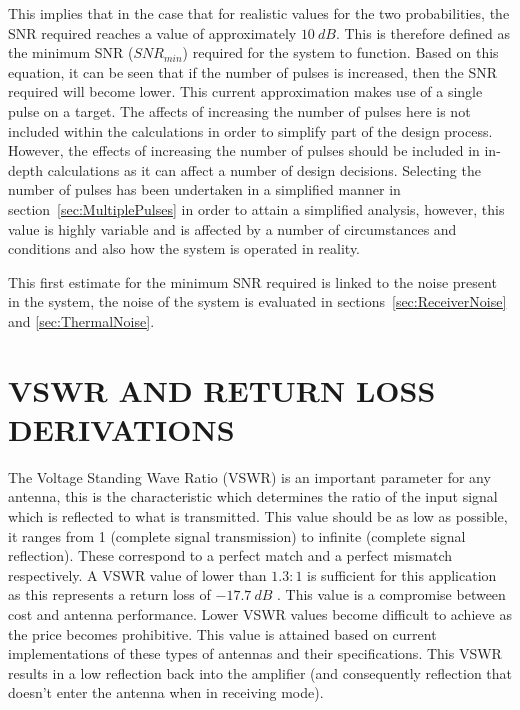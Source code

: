\documentclass[11pt]{witseiepaper}
\begin{document}
\begin{bibunit}[witseie]
This implies that in the case that for realistic values for the two probabilities, the SNR required reaches a value of approximately $10~dB$.
This is therefore defined as the minimum SNR ($SNR_{min}$) required for the system to function.
Based on this equation, it can be seen that if the number of pulses is increased, then the SNR required will become lower. This current approximation makes use of a single pulse on a target. The affects of increasing the number of pulses here is not included within the calculations in order to simplify part of the design process. However, the effects of increasing the number of pulses should be included in in-depth calculations as it can affect a number of design decisions. Selecting the number of pulses has been undertaken in a simplified manner in section~\ref{sec:MultiplePulses} in order to attain a simplified analysis, however, this value is highly variable and is affected by a number of circumstances and conditions and also how the system is operated in reality.


This first estimate for the minimum SNR required is linked to the noise present in the system, the noise of the system is evaluated in sections~\ref{sec:ReceiverNoise} and \ref{sec:ThermalNoise}.


\section{VSWR AND RETURN LOSS DERIVATIONS} \label{sec:VSWRandReturnLossDerivations}
The Voltage Standing Wave Ratio (VSWR) is an important parameter for any antenna, this is the characteristic which determines the ratio of the input signal which is reflected to what is transmitted. This value should be as low as possible, it ranges from 1 (complete signal transmission) to infinite (complete signal reflection). These correspond to a perfect match and a perfect mismatch respectively.
A VSWR value of lower than $1.3:1$ is sufficient for this application as this represents a return loss of $-17.7~dB$ \cite{AntennaPrice1,AntennaPrice2,AntennaPrice3,AntennaPrice4}. This value is a compromise between cost and antenna performance. Lower VSWR values become difficult to achieve as the price becomes prohibitive. This value is attained based on current implementations of these types of antennas and their specifications.
This VSWR results in a low reflection back into the amplifier (and consequently reflection that doesn't enter the antenna when in receiving mode).


\end{bibunit}
\end{document}
